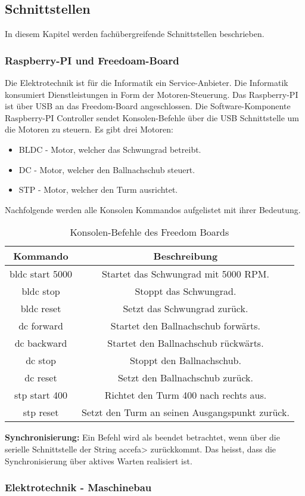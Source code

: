 \subsection{Schnittstellen}
In diesem Kapitel werden fachübergreifende Schnittstellen beschrieben.

\subsubsection{Raspberry-PI und Freedoam-Board}
Die Elektrotechnik ist für die Informatik ein Service-Anbieter. Die Informatik konsumiert Dienstleistungen in Form der Motoren-Steuerung. Das Raspberry-PI ist über USB an das Freedom-Board angeschlossen. Die Software-Komponente Raspberry-PI Controller sendet Konsolen-Befehle über die USB Schnittstelle um die Motoren zu steuern. Es gibt drei Motoren:

\begin{itemize}
	\item BLDC - Motor, welcher das Schwungrad betreibt.
	\item DC - Motor, welcher den Ballnachschub steuert.
	\item STP - Motor, welcher den Turm ausrichtet.
\end{itemize}

\noindent
Nachfolgende werden alle Konsolen Kommandos aufgelistet mit ihrer Bedeutung. \\

\begin{table}[h!]
	\centering
	\begin{tabular}{|c|c|}
		\hline \textbf{Kommando}  & \textbf{Beschreibung} \\ 
		\hline bldc start 5000  & Startet das Schwungrad mit 5000 RPM. \\ 
		\hline bldc stop & Stoppt das Schwungrad.  \\ 
		\hline bldc reset & Setzt das Schwungrad zurück. \\ 
		\hline dc forward & Startet den Ballnachschub forwärts. \\ 
		\hline dc backward & Startet den Ballnachschub rückwärts. \\ 
		\hline dc stop & Stoppt den Ballnachschub. \\ 
	    \hline dc reset & Setzt den Ballnachschub zurück. \\ 
	    \hline stp start 400 & Richtet den Turm 400 nach rechts aus. \\ 
	    \hline stp reset & Setzt den Turm an seinen Ausgangspunkt zurück. \\ 
		\hline 
	\end{tabular} 
	\caption{Konsolen-Befehle des Freedom Boards}
	\label{tab:freedom-board-konsolen-befehle}
\end{table}

\noindent
\textbf{Synchronisierung:} Ein Befehl wird als beendet betrachtet, wenn über die serielle Schnittstelle der String accefa> zurückkommt. Das heisst, dass die Synchronisierung über aktives Warten realisiert ist.

\subsubsection{Elektrotechnik - Maschinebau}